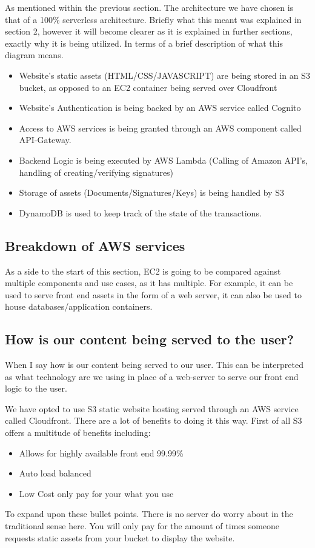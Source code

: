 \documentclass[runningheads]{llncs}
\begin{document}
As mentioned within the previous section. The architecture we have chosen is that of a 100\% serverless architecture. Briefly what this meant was explained in section 2, however it will become clearer as it is explained in further sections, exactly why it is being utilized. In terms of a brief description of what this diagram means.

\begin{itemize}
	\item Website's static assets (HTML/CSS/JAVASCRIPT) are being stored in an S3 bucket, as opposed to an EC2 container being served over Cloudfront
	\item Website's Authentication is being backed by an AWS service called Cognito
	\item Access to AWS services is being granted through an AWS component called API-Gateway.
	\item Backend Logic is being executed by AWS Lambda (Calling of Amazon API's, handling of creating/verifying signatures)
	\item Storage of assets (Documents/Signatures/Keys) is being handled by S3
	\item DynamoDB is used to keep track of the state of the transactions.
\end{itemize}

\subsection{Breakdown of AWS services}
As a side to the start of this section, EC2 is going to be compared against multiple components and use cases, as it has multiple. For example, it can be used to serve front end assets in the form of a web server, it can also be used to house databases/application containers.
\subsection{How is our content being served to the user?}
When I say how is our content being served to our user. This can be interpreted as what technology are we using in place of a web-server to serve our front end logic to the user.

We have opted to use S3 static website hosting served through an AWS service called Cloudfront. There are a lot of benefits to doing it this way. First of all S3 offers a multitude of benefits including:

\begin{itemize}
	\item Allows for highly available front end 99.99\%
	\item Auto load balanced
	\item Low Cost only pay for your what you use
\end{itemize}
To expand upon these bullet points. There is no server do worry about in the traditional sense here. You will only pay for the amount of times someone requests static assets from your bucket to display the website.
\end{document}
